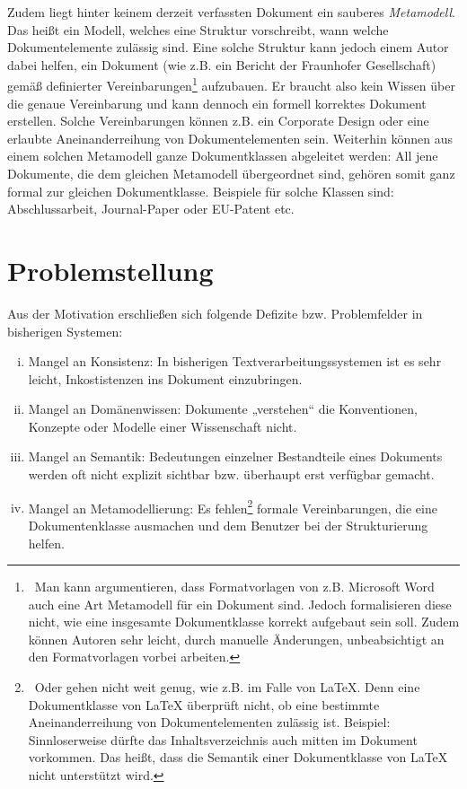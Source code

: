  
Zudem liegt hinter keinem derzeit verfassten Dokument ein sauberes \emph{Metamodell}. Das heißt ein Modell, welches eine Struktur vorschreibt, wann welche Dokumentelemente zulässig sind. Eine solche Struktur kann jedoch einem Autor dabei helfen, ein Dokument (wie z.B. ein Bericht der Fraunhofer Gesellschaft) gemäß definierter Vereinbarungen\footnote{~Man kann argumentieren, dass Formatvorlagen von z.B. Microsoft Word auch eine Art Metamodell für ein Dokument sind. Jedoch formalisieren diese nicht, wie eine insgesamte Dokumentklasse korrekt aufgebaut sein soll. Zudem können Autoren sehr leicht, durch manuelle Änderungen, unbeabsichtigt an den Formatvorlagen vorbei arbeiten.} aufzubauen. Er braucht also kein Wissen über die genaue Vereinbarung und kann dennoch ein formell korrektes Dokument erstellen. Solche Vereinbarungen können z.B. ein Corporate Design oder eine erlaubte Aneinanderreihung von Dokumentelementen sein. Weiterhin können aus einem solchen Metamodell ganze Dokumentklassen abgeleitet werden: All jene Dokumente, die dem gleichen Metamodell übergeordnet sind, gehören somit ganz formal zur gleichen Dokumentklasse. Beispiele für solche Klassen sind: Abschlussarbeit, Journal-Paper oder EU-Patent etc.

 
\section{Problemstellung}\label{problemstellung}
 
Aus der Motivation erschließen sich folgende Defizite bzw. Problemfelder in bisherigen Systemen:

 
\begin{enumerate}[(i)]

\item
Mangel an Konsistenz: In bisherigen Textverarbeitungssystemen ist es sehr leicht, Inkostistenzen ins Dokument einzubringen.


\item
Mangel an Domänenwissen: Dokumente „verstehen“ die Konventionen, Konzepte oder Modelle einer Wissenschaft nicht.


\item
Mangel an Semantik: Bedeutungen einzelner Bestandteile eines Dokuments werden oft nicht explizit sichtbar bzw. überhaupt erst verfügbar gemacht.


\item
Mangel an Metamodellierung: Es fehlen\footnote{~Oder gehen nicht weit genug, wie z.B. im Falle von LaTeX. Denn eine Dokumentklasse von LaTeX überprüft nicht, ob eine bestimmte Aneinanderreihung von Dokumentelementen zulässig ist. Beispiel: Sinnloserweise dürfte das Inhaltsverzeichnis auch mitten im Dokument vorkommen. Das heißt, dass die Semantik einer Dokumentklasse von LaTeX nicht unterstützt wird.} formale Vereinbarungen, die eine Dokumentenklasse ausmachen und dem Benutzer bei der Strukturierung helfen.


\end{enumerate}
 
